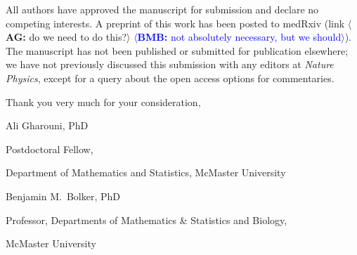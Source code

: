 \documentclass[12pt,letterpaper]{letter}
\newcommand{\ali}[1]{\textcolor{blush}{$\langle$\textbf{AG:} #1$\rangle$}}
\newcommand{\bmb}[1]{\textcolor{blue}{$\langle$\textbf{BMB:} #1$\rangle$}}
\newcommand{\journalname}{\emph{Nature Physics}\xspace}
\begin{document}
All authors have approved the manuscript for submission and declare no competing interests. A preprint of this work has been posted to medRxiv (link \ali{do we need to do this?} \bmb{not absolutely necessary, but we should}). The manuscript has not been published or submitted for publication elsewhere; we have not previously discussed this submission with any editors at \journalname{}, except for a query about the open access options for commentaries.

Thank you very much for your consideration,

\begin{flushleft}
\footnotesize

Ali Gharouni, PhD
\setlength{\parskip}{0em}

Postdoctoral Fellow, 

Department of Mathematics and Statistics, McMaster University

\vspace{1em}

Benjamin M.\ Bolker, PhD

Professor, Departments of Mathematics \& Statistics and Biology, 

McMaster University

\end{flushleft}

\thispagestyle{empty}
\end{document}

